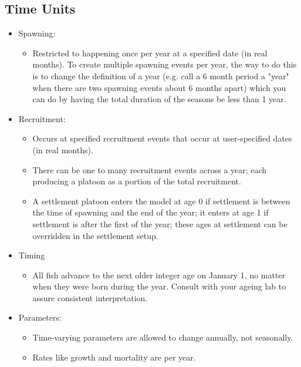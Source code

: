 \hypertarget{RecrTiming}{}
\subsection{Time Units}
	\begin{itemize}
		\item Spawning:
		\begin{itemize}
			\item Restricted to happening once per year at a specified date (in real months). To create multiple spawning events per year, the way to do this is to change the definition of a year (e.g. call a 6 month period a "year" when there are two spawning events about 6 months apart) which you can do by having the total duration of the seasons be less than 1 year. 
		\end{itemize}
		
		\item Recruitment:   
		\begin{itemize}
			\item Occurs at specified recruitment events that occur at user-specified dates (in real months).
			\item There can be one to many recruitment events across a year; each producing a platoon as a portion of the total recruitment.
			\item A settlement platoon enters the model at age 0 if settlement is between the time of spawning and the end of the year; it enters at age 1 if settlement is after the first of the year; these ages at settlement can be overridden in the settlement setup.
		\end{itemize}
		
		\item Timing
		\begin{itemize}
			\item All fish advance to the next older integer age on January 1, no matter when they were born during the year.  Consult with your ageing lab to assure consistent interpretation.
		\end{itemize}		

		\item Parameters:
		\begin{itemize}
			\item Time-varying parameters are allowed to change annually, not seasonally.
			\item Rates like growth and mortality are per year.
		\end{itemize}
	\end{itemize}
	
